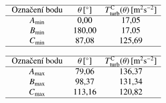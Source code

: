 \begin{minipage}{\textwidth}
	\hspace{-3mm}
	\begin{minipage}[b]{0.4\textwidth}
		\bgroup
		\setlength\tabcolsep{3mm}
		\def\arraystretch{1.7}%
		$$
		\begin{array}{ccc}
		\hline \text { Označení bodu } & \theta \, [^{\circ}] & T^{\text{C}}_{\text{turb}} (\theta) \, [\text{m}^{2} \text{s}^{-2}] \\
		\hline
		A_{\min} & 0{,}00 & 17{,}05 \\
		B_{\min} & 180{,}00 & 17{,}05 \\
		C_{\min} & 87{,}08 & 125{,}69 \\
		\hline
		\end{array}
		$$
		\egroup
	\end{minipage}%
	\begin{minipage}[b]{0.16\textwidth}
		\centering
		\hspace{-4mm}
	\end{minipage}%
	\begin{minipage}[b]{0.4\textwidth}
		\bgroup
		\setlength\tabcolsep{3mm}
		\def\arraystretch{1.7}%
		$$
		\begin{array}{ccc}
		\hline \text { Označení bodu } & \theta \, [^{\circ}] & T^{\text{C}}_{\text{turb}} (\theta) \, [\text{m}^{2} \text{s}^{-2}] \\
		\hline
		A_{\max} & 79{,}06 & 136{,}37 \\
		B_{\max} & 98{,}37 & 131{,}34 \\
		C_{\max} & 113{,}16 & 120{,}82 \\
		\hline
		\end{array}
		$$
		\egroup
	\end{minipage}
	\vspace{4mm}
	\hfill
\end{minipage}

